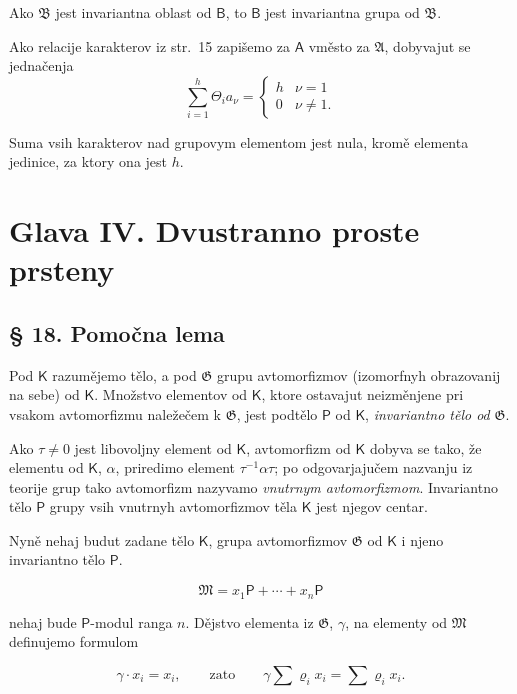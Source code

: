 \documentclass[11pt]{article}
\begin{document}
Ako \(\mathfrak B\) jest invariantna oblast od \(\mathsf B\), to \(\mathsf B\) jest invariantna grupa od \(\mathfrak B\).

Ako relacije karakterov iz str.~15 zapišemo za \(\mathsf A\) vměsto za \(\mathfrak A\), dobyvajut se jednačenja
\[
\sum_{i=1}^{h} \Theta_i a_\nu =
\begin{cases}
h & \nu=1\\
0 & \nu\ne 1.
\end{cases}
\]

Suma vsih karakterov nad grupovym elementom jest nula, kromě elementa jedinice, za ktory ona jest \(h\).

\section*{Glava IV. Dvustranno proste prsteny}\label{kapitel-iv.-zweiseitig-einfache-ringe}

\subsection*{§ 18. Pomočna lema}\label{ein-hilfssatz}

Pod \(\mathsf K\) razumějemo tělo, a pod \(\mathfrak G\) grupu avtomorfizmov (izomorfnyh obrazovanij na sebe) od \(\mathsf K\). Množstvo elementov od \(\mathsf K\), ktore ostavajut neizměnjene pri vsakom avtomorfizmu naležečem k \(\mathfrak G\), jest podtělo \(\mathsf P\) od \(\mathsf K\), \emph{invariantno tělo od} \(\mathfrak G\).

Ako \(\tau\ne 0\) jest libovoljny element od \(\mathsf K\), avtomorfizm od \(\mathsf K\) dobyva se tako, že elementu od \(\mathsf K\), \(\alpha\), priredimo element \(\tau^{-1}\alpha\tau\); po odgovarjajučem nazvanju iz teorije grup tako avtomorfizm nazyvamo \emph{vnutrnym avtomorfizmom}. Invariantno tělo \(\mathsf P\) grupy vsih vnutrnyh avtomorfizmov těla \(\mathsf K\) jest njegov centar.

Nyně nehaj budut zadane tělo \(\mathsf K\), grupa avtomorfizmov \(\mathfrak G\) od \(\mathsf K\) i njeno invariantno tělo \(\mathsf P\).

\[
\mathfrak M=x_1\mathsf P+\cdots+x_n\mathsf P
\]

nehaj bude \(\mathsf P\)-modul ranga \(n\). Dějstvo elementa iz \(\mathfrak G\), \(\gamma\), na elementy od \(\mathfrak M\) definujemo formulom

\[
\gamma\cdot x_i=x_i,\qquad\text{zato}\qquad
\gamma\sum \varrho_i x_i=\sum \varrho_i x_i.
\]
\end{document}
